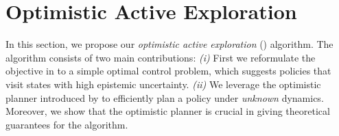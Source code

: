 \section{Optimistic Active Exploration}\label{sec:opacex}
In this section, we propose our \emph{optimistic active exploration} (\opacex) algorithm. The algorithm consists of two main contributions: \emph{(i)} First we reformulate the objective in  to a simple optimal control problem, which suggests policies that visit states with high epistemic uncertainty.
\emph{(ii)} We leverage the optimistic planner introduced by \citet{curi2020efficient} to efficiently plan a policy under  \emph{unknown} dynamics. Moreover, we show that the optimistic planner is crucial in giving theoretical guarantees for the algorithm.
